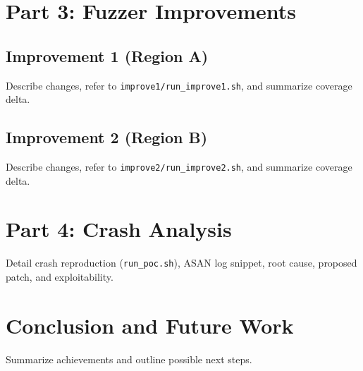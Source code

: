\documentclass[11pt,a4paper,twocolumn]{article}
\begin{document}
\section{Part 3: Fuzzer Improvements}
\subsection{Improvement 1 (Region A)}
Describe changes, refer to \texttt{improve1/run\_improve1.sh}, and summarize coverage delta.
\subsection{Improvement 2 (Region B)}
Describe changes, refer to \texttt{improve2/run\_improve2.sh}, and summarize coverage delta.

\section{Part 4: Crash Analysis}
Detail crash reproduction (\texttt{run\_poc.sh}), ASAN log snippet, root cause, proposed patch, and exploitability.

\section{Conclusion and Future Work}
Summarize achievements and outline possible next steps.

\printbibliography
\end{document}

